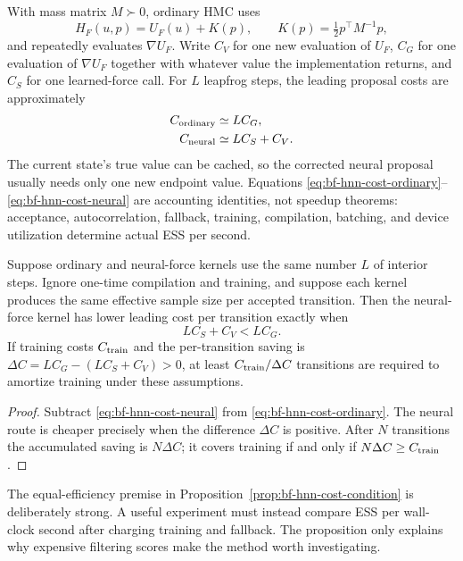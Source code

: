 With mass matrix $M\succ0$, ordinary HMC uses
\begin{equation}
 H_F(u,p)=U_F(u)+K(p),\qquad
 K(p)=\tfrac12p^\top M^{-1}p,
 \label{eq:bf-hnn-true-hamiltonian}
\end{equation}
and repeatedly evaluates $\nabla U_F$.  Write $C_V$ for one new evaluation of
$U_F$, $C_G$ for one evaluation of $\nabla U_F$ together with whatever value
the implementation returns, and $C_S$ for one learned-force call.  For $L$
leapfrog steps, the leading proposal costs are approximately
\begin{align}
 C_{\rm ordinary}&\simeq L C_G,\label{eq:bf-hnn-cost-ordinary}\\
 C_{\rm neural}&\simeq L C_S+C_V.\label{eq:bf-hnn-cost-neural}
\end{align}
The current state's true value can be cached, so the corrected neural proposal
usually needs only one new endpoint value.  Equations
\eqref{eq:bf-hnn-cost-ordinary}--\eqref{eq:bf-hnn-cost-neural} are accounting
identities, not speedup theorems: acceptance, autocorrelation, fallback,
training, compilation, batching, and device utilization determine actual ESS
per second.

\begin{proposition}
\label{prop:bf-hnn-cost-condition}
Suppose ordinary and neural-force kernels use the same number $L$ of interior
steps.  Ignore one-time compilation and training, and suppose each kernel
produces the same effective sample size per accepted transition.  Then the
neural-force kernel has lower leading cost per transition exactly when
\begin{equation}
  L C_S+C_V<L C_G.
  \label{eq:bf-hnn-cost-condition}
\end{equation}
If training costs $C_{\rm train}$ and the per-transition saving is
$\Delta C=L C_G-(L C_S+C_V)>0$, at least
$C_{\rm train}/\Delta C$ transitions are required to amortize training under
these assumptions.
\end{proposition}

\begin{proof}
Subtract \eqref{eq:bf-hnn-cost-neural} from
\eqref{eq:bf-hnn-cost-ordinary}.  The neural route is cheaper precisely when
the difference $\Delta C$ is positive.  After $N$ transitions the accumulated
saving is $N\Delta C$; it covers training if and only if
$N\Delta C\ge C_{\rm train}$.
\end{proof}

The equal-efficiency premise in Proposition~\ref{prop:bf-hnn-cost-condition}
is deliberately strong.  A useful experiment must instead compare ESS per
wall-clock second after charging training and fallback.  The proposition only
explains why expensive filtering scores make the method worth investigating.

